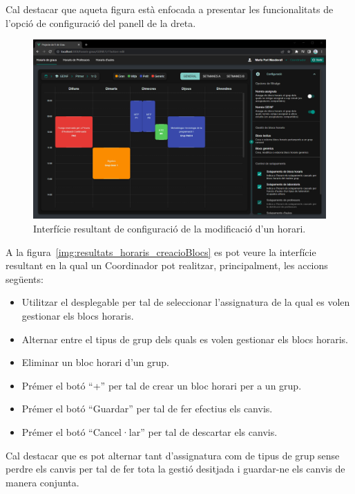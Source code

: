 \documentclass[a4paper,12pt]{ThesisStyle}
\begin{document}
Cal destacar que aqueta figura està enfocada a presentar les funcionalitats de l'opció de configuració del panell de la dreta.

\begin{figure}[H]
  \centering
  \includegraphics[width=\textwidth]{assets/results/horaris/configuracio.png}
  \caption{\label{img:resultats_horaris_configuracio}Interfície resultant de configuració de la modificació d'un horari.}
\end{figure}

\newpage

A la figura~\ref{img:resultats_horaris_creacioBlocs} es pot veure la interfície resultant en la qual un Coordinador pot realitzar, principalment, les accions següents:
\begin{itemize}
  \item Utilitzar el desplegable per tal de seleccionar l'assignatura de la qual es volen gestionar els blocs horaris.
  \item Alternar entre el tipus de grup dels quals es volen gestionar els blocs horaris.
  \item Eliminar un bloc horari d'un grup.
  \item Prémer el botó ``+'' per tal de crear un bloc horari per a un grup.
  \item Prémer el botó ``Guardar'' per tal de fer efectius els canvis.
  \item Prémer el botó ``Cancel·lar'' per tal de descartar els canvis.
\end{itemize}

Cal destacar que es pot alternar tant d'assignatura com de tipus de grup sense perdre els canvis per tal de fer tota la gestió desitjada i guardar-ne els canvis de manera conjunta.
\end{document}
